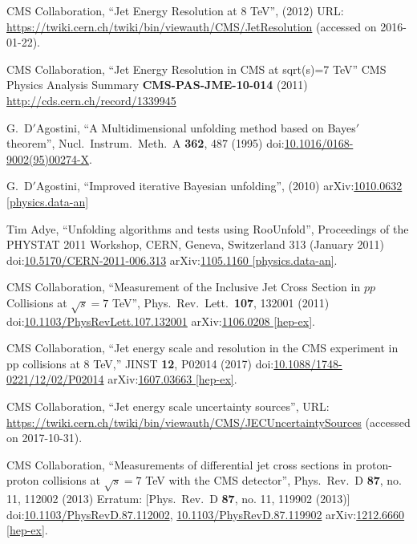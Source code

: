 \begin{thebibliography}{99}
CMS Collaboration, ``Jet Energy Resolution at 8 TeV'', (2012) URL: \url{https://twiki.cern.ch/twiki/bin/viewauth/CMS/JetResolution} (accessed on 2016-01-22).

CMS Collaboration, ``Jet Energy Resolution in CMS at sqrt(s)=7 TeV'' CMS Physics Analysis Summary {\bf CMS-PAS-JME-10-014} (2011) \url {http://cds.cern.ch/record/1339945}

G.~D$'$Agostini, ``A Multidimensional unfolding method based on Bayes$'$ theorem'', Nucl.\ Instrum.\ Meth.\ A {\bf 362}, 487 (1995) doi:\href{http://dx.doi.org/10.1016/0168-9002(95)00274-X}{10.1016/0168-9002(95)00274-X}.

G.~D$'$Agostini, ``Improved iterative Bayesian unfolding'', (2010) arXiv:\href{https://arxiv.org/abs/1010.0632}{1010.0632 [physics.data-an]}

Tim Adye, ``Unfolding algorithms and tests using RooUnfold'', Proceedings of the PHYSTAT 2011 Workshop, CERN, Geneva, Switzerland 313 (January 2011) doi:\href{http://dx.doi.org/10.5170/CERN-2011-006.313}{10.5170/CERN-2011-006.313} arXiv:\href{https://arxiv.org/abs/1105.1160}{1105.1160 [physics.data-an]}.

CMS Collaboration, ``Measurement of the Inclusive Jet Cross Section in $pp$ Collisions at $\sqrt{s}=7$ TeV'', Phys.\ Rev.\ Lett.\ {\bf 107}, 132001 (2011) doi:\href{https://doi.org/10.1103/PhysRevLett.107.132001}{10.1103/PhysRevLett.107.132001} arXiv:\href{https://arxiv.org/abs/1106.0208}{1106.0208 [hep-ex]}.

CMS Collaboration, ``Jet energy scale and resolution in the CMS experiment in pp collisions at 8 TeV,'' JINST {\bf 12}, P02014 (2017) doi:\href{http://dx.doi.org/10.1088/1748-0221/12/02/P02014}{10.1088/1748-0221/12/02/P02014} arXiv:\href{https://arxiv.org/abs/1607.03663}{1607.03663 [hep-ex]}.

CMS Collaboration, ``Jet energy scale uncertainty sources'', URL: \url{https://twiki.cern.ch/twiki/bin/viewauth/CMS/JECUncertaintySources} (accessed on 2017-10-31).

CMS Collaboration, ``Measurements of differential jet cross sections in proton-proton collisions at $\sqrt{s}=7$ TeV with the CMS detector'',  Phys.\ Rev.\ D {\bf 87}, no. 11, 112002 (2013) Erratum: [Phys.\ Rev.\ D {\bf 87}, no. 11, 119902 (2013)] doi:\href{http://dx.doi.org/10.1103/PhysRevD.87.112002}{10.1103/PhysRevD.87.112002}, \href{http://dx.doi.org/10.1103/PhysRevD.87.119902}{10.1103/PhysRevD.87.119902} arXiv:\href{https://arxiv.org/abs/1212.6660}{1212.6660 [hep-ex]}.


\end{thebibliography}
